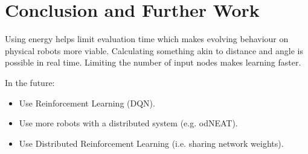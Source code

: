 \documentclass{article}
\begin{document}

	\section{Conclusion and Further Work} %
	\label{sec:conclusion}
	Using energy helps limit evaluation time which makes evolving behaviour on
	physical robots more viable.
	Calculating something akin to distance and angle is possible in real time.
	Limiting the number of input nodes makes learning faster. %

	In the future:\\
	\begin{itemize}
		\item Use Reinforcement Learning (DQN).\\
		\item Use more robots with a distributed system (e.g. odNEAT).\\
		\item Use Distributed Reinforcement Learning (i.e. sharing network
			weights).
	\end{itemize}



\end{document}
